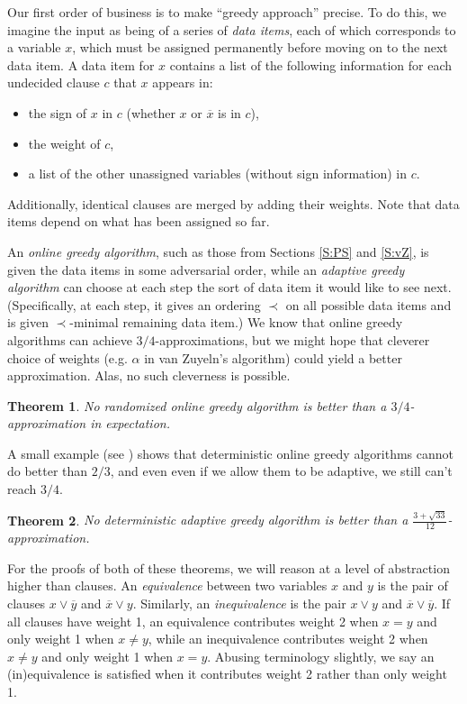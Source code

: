 \documentclass[11pt,letter]{article}
\newtheorem{theorem}{Theorem}
\numberwithin{theorem}{section}
\newcommand{\ol}{\overline}
\begin{document}
Our first order of business is to make ``greedy approach'' precise.
To do this, we imagine the input as being of a series of \emph{data items},
each of which corresponds to a variable $x$,
which must be assigned permanently before moving on to the next data item.
A data item for $x$ contains a list of the following information
for each undecided clause $c$ that $x$ appears in:
\begin{itemize}
\item
  the sign of $x$ in $c$ (whether $x$ or $\ol{x}$ is in $c$),
\item
  the weight of $c$,
\item
  a list of the other unassigned variables (without sign information) in $c$.
\end{itemize}
Additionally, identical clauses are merged by adding their weights.
Note that data items depend on what has been assigned so far.

An \emph{online greedy algorithm},
such as those from Sections \ref{S:PS} and \ref{S:vZ},
is given the data items in some adversarial order,
while an \emph{adaptive greedy algorithm}
can choose at each step the sort of data item it would like to see next.
(Specifically, at each step,
it gives an ordering $\prec$ on all possible data items
and is given $\prec$-minimal remaining data item.)
We know that online greedy algorithms can achieve $3/4$-approximations,
but we might hope that cleverer choice of weights
(e.g. $\alpha$ in van Zuyeln's algorithm)
could yield a better approximation.
Alas, no such cleverness is possible.

\begin{theorem}\label{theorem:greedyRandomized}
  No randomized online greedy algorithm
  is better than a $3/4$-approximation in expectation.
\end{theorem}

A small example (see \cite{DBLP:conf/esa/Poloczek11}) shows that
deterministic online greedy algorithms cannot do better than $2/3$,
and even even if we allow them to be adaptive, we still can't reach $3/4$.

\begin{theorem}\label{theorem:greedyDeterministic}
  No deterministic adaptive greedy algorithm
  is better than a $\frac{3 + \sqrt{33}}{12}$-approximation.
\end{theorem}

For the proofs of both of these theorems,
we will reason at a level of abstraction higher than clauses.
An \emph{equivalence} between two variables $x$ and $y$
is the pair of clauses $x \lor \ol{y}$ and $\ol{x} \lor y$.
Similarly, an \emph{inequivalence} is
the pair $x \lor y$ and $\ol{x} \lor \ol{y}$.
If all clauses have weight 1,
an equivalence contributes weight 2 when $x = y$
and only weight 1 when $x \neq y$,
while an inequivalence contributes weight 2 when $x \neq y$
and only weight 1 when $x = y$.
Abusing terminology slightly,
we say an (in)equivalence is satisfied
when it contributes weight 2 rather than only weight 1.
\end{document}
